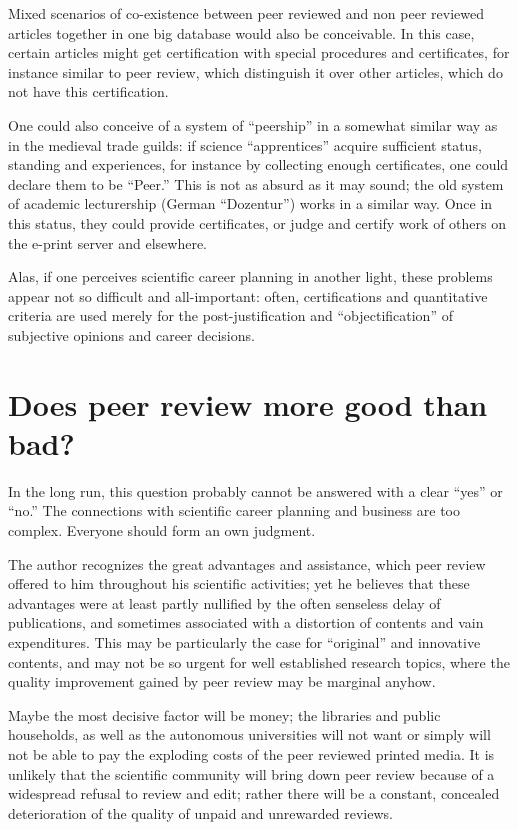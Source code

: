 Mixed scenarios of co-existence between peer
reviewed and non peer reviewed articles together in one big database would also be conceivable.
In this case, certain articles might get certification with special
procedures and certificates, for instance similar to peer review,
which distinguish it over other articles, which do not have this
certification.

One could also conceive of a system of ``peership'' in a somewhat similar
way as in the medieval trade guilds:  if science ``apprentices''
acquire sufficient status, standing and experiences, for instance by
collecting enough certificates, one could declare them to be ``Peer.''
This is not as absurd as it may sound; the old system of academic
lecturership (German ``Dozentur'') works in a similar way.
Once in this status, they could provide certificates, or judge and certify work of
others on the e-print server and elsewhere.

Alas, if one perceives scientific career planning in another light,
these problems appear not so difficult and all-important:  often,
certifications and quantitative criteria are used merely
for the post-justification
and ``objectification'' of subjective opinions and career decisions.


\section{Does peer review more good than bad?}

In the long run, this question probably cannot be answered with a
clear ``yes'' or  ``no.'' The connections with scientific career
planning and business are too complex.  Everyone should form an own
judgment.

The author recognizes the great advantages and assistance, which peer
review offered to him throughout his scientific activities;
yet he believes that these advantages were at least partly
nullified by the often senseless delay of publications, and sometimes
associated with a distortion of contents and vain expenditures.  This
may be particularly the case for ``original'' and innovative contents,
and may not be so urgent for well established research topics, where the
quality improvement gained by peer review may be marginal anyhow.

Maybe the most decisive factor will be money;
the libraries and public households, as well as the autonomous
universities will not want or simply will not be able to pay the
exploding costs of the peer reviewed printed media.  It is unlikely that
the scientific community will bring down peer review because of a
widespread refusal to review and edit; rather there will be a constant,
concealed deterioration of the quality of unpaid and unrewarded reviews.

